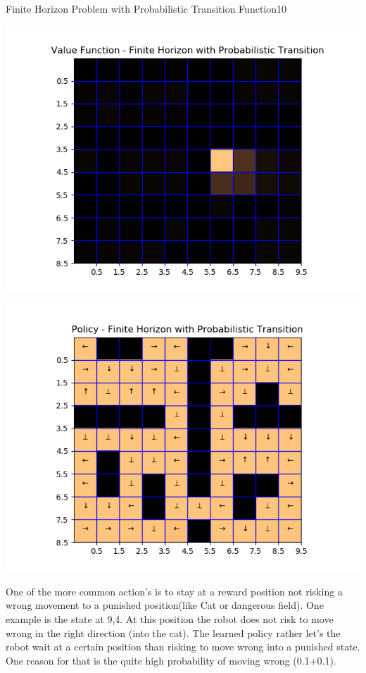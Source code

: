 \begin{questions}
\begin{question}{Finite Horizon Problem with Probabilistic Transition Function}{10}
\begin{answer}
		\noindent\begin{minipage}{.5\textwidth}
			\centering
			\includegraphics[width=1\textwidth]{img/value_2d.png} 
			\label{fig:2d1}            
		\end{minipage}%
		\begin{minipage}{.5\textwidth}
			\centering
			\includegraphics[width=1\textwidth]{img/policy_2d.png} 
			\label{fig:2d2}               
		\end{minipage}
	One of the more common action's is to stay at a reward position not risking a wrong movement to a punished position(like Cat or dangerous field). One example is the state at 9,4. At this position the robot does not risk to move wrong in the right direction (into the cat). The learned policy rather let's the robot wait at a certain position than risking to move wrong into a punished state. One reason for that is the quite high probability of moving wrong (0.1+0.1).


\end{answer}
\end{question}
\end{questions}
